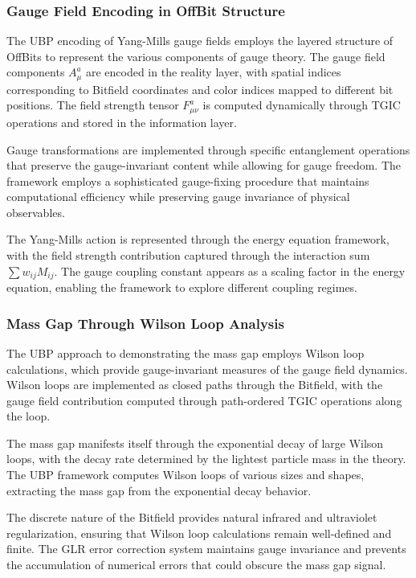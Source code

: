 \documentclass[11pt]{amsart}
\begin{document}
\subsubsection{Gauge Field Encoding in OffBit Structure}

The UBP encoding of Yang-Mills gauge fields employs the layered structure of OffBits to represent the various components of gauge theory. The gauge field components $A_\mu^a$ are encoded in the reality layer, with spatial indices corresponding to Bitfield coordinates and color indices mapped to different bit positions. The field strength tensor $F_{\mu\nu}^a$ is computed dynamically through TGIC operations and stored in the information layer.

Gauge transformations are implemented through specific entanglement operations that preserve the gauge-invariant content while allowing for gauge freedom. The framework employs a sophisticated gauge-fixing procedure that maintains computational efficiency while preserving gauge invariance of physical observables.

The Yang-Mills action is represented through the energy equation framework, with the field strength contribution captured through the interaction sum $\sum w_{ij} M_{ij}$. The gauge coupling constant appears as a scaling factor in the energy equation, enabling the framework to explore different coupling regimes.

\subsubsection{Mass Gap Through Wilson Loop Analysis}

The UBP approach to demonstrating the mass gap employs Wilson loop calculations, which provide gauge-invariant measures of the gauge field dynamics. Wilson loops are implemented as closed paths through the Bitfield, with the gauge field contribution computed through path-ordered TGIC operations along the loop.

The mass gap manifests itself through the exponential decay of large Wilson loops, with the decay rate determined by the lightest particle mass in the theory. The UBP framework computes Wilson loops of various sizes and shapes, extracting the mass gap from the exponential decay behavior.

The discrete nature of the Bitfield provides natural infrared and ultraviolet regularization, ensuring that Wilson loop calculations remain well-defined and finite. The GLR error correction system maintains gauge invariance and prevents the accumulation of numerical errors that could obscure the mass gap signal.
\end{document}
